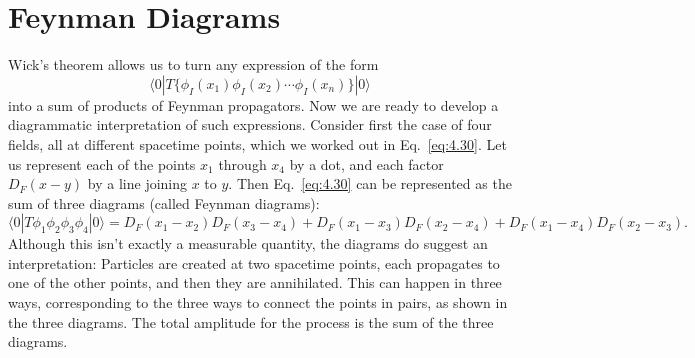 \section{Feynman Diagrams}

Wick's theorem allows us to turn any expression of the form
\begin{equation}
  \langle 0|T\{\phi_I(x_1)\phi_I(x_2)\cdots\phi_I(x_n)\}|0\rangle
\end{equation}
into a sum of products of Feynman propagators.  Now we are ready to develop a
diagrammatic interpretation of such expressions.  Consider first the case of
four fields, all at different spacetime points, which we worked out in
Eq.~\eqref{eq:4.30}.  Let us represent each of the points $x_1$ through $x_4$
by a dot, and each factor $D_F(x-y)$ by a line joining $x$ to $y$.  Then
Eq.~\eqref{eq:4.30} can be represented as the sum of three diagrams (called
Feynman diagrams):
\begin{equation}
  \langle 0|T\phi_1\phi_2\phi_3\phi_4|0\rangle = D_F(x_1-x_2)D_F(x_3-x_4)
    + D_F(x_1-x_3)D_F(x_2-x_4)
    + D_F(x_1-x_4)D_F(x_2-x_3) .
  \label{eq:4.42}
\end{equation}
Although this isn't exactly a measurable quantity, the diagrams do suggest an
interpretation: Particles are created at two spacetime points, each propagates
to one of the other points, and then they are annihilated.  This can happen in
three ways, corresponding to the three ways to connect the points in pairs, as
shown in the three diagrams.  The total amplitude for the process is the sum
of the three diagrams.

